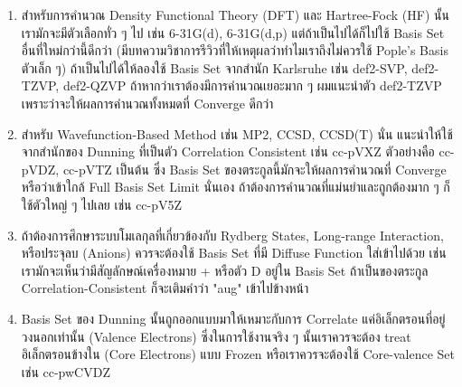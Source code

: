 \begin{enumerate}
  \item สำหรับการคำนวณ Density Functional Theory (DFT) และ Hartree-Fock (HF) นั้นเรามักจะมีตัวเลือกทั่ว ๆ ไป เช่น
        6-31G(d), 6-31G(d,p) แต่ถ้าเป็นไปได้ก็ไปใช้ Basis Set อื่นที่ใหม่กว่านี้ดีกว่า (มีบทความวิชาการรีวิวที่ให้เหตุผลว่าทำไมเราถึงไม่ควรใช้
        Pople's Basis ตัวเล็ก ๆ) ถ้าเป็นไปได้ให้ลองใช้ Basis Set จากสำนัก Karlsruhe เช่น def2-SVP, def2-TZVP, def2-QZVP
        ถ้าหากว่าเราต้องมีการคำนวณเยอะมาก ๆ ผมแนะนำตัว def2-TZVP เพราะว่าจะให้ผลการคำนวณทั้งหมดที่ Converge ดีกว่า

  \item สำหรับ Wavefunction-Based Method เช่น MP2, CCSD, CCSD(T) นั่น แนะนำให้ใช้จากสำนักของ Dunning ที่เป็นตัว
        Correlation Consistent เช่น cc-pVXZ ตัวอย่างคือ cc-pVDZ, cc-pVTZ เป็นต้น ซึ่ง Basis Set ของตระกูลนี้มักจะให้ผลการคำนวณที่
        Converge หรือว่าเข้าใกล้ Full Basis Set Limit นั่นเอง ถ้าต้องการคำนวณที่แม่นยำและถูกต้องมาก ๆ ก็ใช้ตัวใหญ่ ๆ ไปเลย
        เช่น cc-pV5Z

  \item ถ้าต้องการศึกษาระบบโมเลกุลที่เกี่ยวข้องกับ Rydberg States, Long-range Interaction, หรือประจุลบ (Anions)
        ควรจะต้องใช้ Basis Set ที่มี Diffuse Function ใส่เข้าไปด้วย เช่น เรามักจะเห็นว่ามีสัญลักษณ์เครื่องหมาย + หรือตัว D อยู่ใน
        Basis Set ถ้าเป็นของตระกูล Correlation-Consistent ก็จะเติมคำว่า "aug" เข้าไปข้างหน้า

  \item Basis Set ของ Dunning นั้นถูกออกแบบมาให้เหมาะกับการ Correlate แค่อิเล็กตรอนที่อยู่วงนอกเท่านั้น (Valence Electrons)
        ซึ่งในการใช้งานจริง ๆ นั้นเราควรจะต้อง treat อิเล็กตรอนข้างใน (Core Electrons) แบบ Frozen หรือเราควรจะต้องใช้
        Core-valence Set เช่น cc-pwCVDZ
\end{enumerate}

